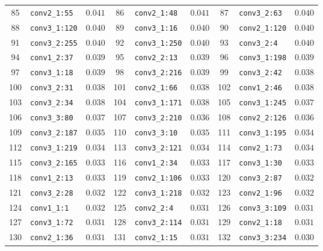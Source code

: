 \begin{center}
\begin{longtable}{c l l | c l l | c l l }
        85 & \texttt{conv2\_1:55} & $0.041$ & 86 & \texttt{conv2\_1:48} & $0.041$ & 87 & \texttt{conv3\_2:63} & $0.040$ \\
        88 & \texttt{conv3\_1:120} & $0.040$ & 89 & \texttt{conv3\_1:16} & $0.040$ & 90 & \texttt{conv2\_1:120} & $0.040$ \\
        91 & \texttt{conv3\_2:255} & $0.040$ & 92 & \texttt{conv3\_1:250} & $0.040$ & 93 & \texttt{conv3\_2:4} & $0.040$ \\
        94 & \texttt{conv1\_2:37} & $0.039$ & 95 & \texttt{conv2\_2:13} & $0.039$ & 96 & \texttt{conv3\_1:198} & $0.039$ \\
        97 & \texttt{conv3\_1:18} & $0.039$ & 98 & \texttt{conv3\_2:216} & $0.039$ & 99 & \texttt{conv3\_2:42} & $0.038$ \\
        100 & \texttt{conv3\_2:31} & $0.038$ & 101 & \texttt{conv2\_1:66} & $0.038$ & 102 & \texttt{conv1\_2:46} & $0.038$ \\
        103 & \texttt{conv3\_2:34} & $0.038$ & 104 & \texttt{conv3\_1:171} & $0.038$ & 105 & \texttt{conv3\_1:245} & $0.037$ \\
        106 & \texttt{conv3\_3:80} & $0.037$ & 107 & \texttt{conv3\_2:210} & $0.036$ & 108 & \texttt{conv2\_2:126} & $0.036$ \\
        109 & \texttt{conv3\_2:187} & $0.035$ & 110 & \texttt{conv3\_3:10} & $0.035$ & 111 & \texttt{conv3\_1:195} & $0.034$ \\
        112 & \texttt{conv3\_1:219} & $0.034$ & 113 & \texttt{conv3\_2:121} & $0.034$ & 114 & \texttt{conv2\_1:73} & $0.034$ \\
        115 & \texttt{conv3\_2:165} & $0.033$ & 116 & \texttt{conv1\_2:34} & $0.033$ & 117 & \texttt{conv3\_1:30} & $0.033$ \\
        118 & \texttt{conv1\_2:13} & $0.033$ & 119 & \texttt{conv2\_1:106} & $0.033$ & 120 & \texttt{conv3\_2:87} & $0.032$ \\
        121 & \texttt{conv3\_2:28} & $0.032$ & 122 & \texttt{conv3\_1:218} & $0.032$ & 123 & \texttt{conv2\_1:96} & $0.032$ \\
        124 & \texttt{conv1\_1:1} & $0.032$ & 125 & \texttt{conv2\_2:4} & $0.031$ & 126 & \texttt{conv3\_3:109} & $0.031$ \\
        127 & \texttt{conv3\_1:72} & $0.031$ & 128 & \texttt{conv3\_2:114} & $0.031$ & 129 & \texttt{conv2\_1:18} & $0.031$ \\
        130 & \texttt{conv2\_1:36} & $0.031$ & 131 & \texttt{conv2\_1:15} & $0.031$ & 132 & \texttt{conv3\_3:234} & $0.030$ \\

\end{longtable}
\end{center}
